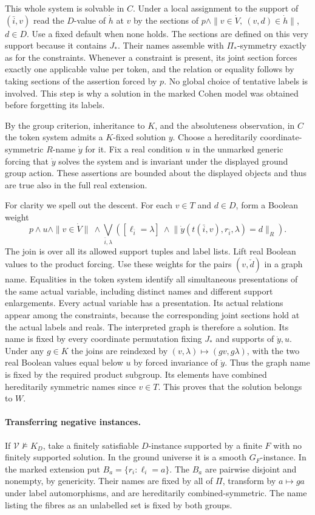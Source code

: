 \documentclass[11pt]{article}
\begin{document}
This whole system is solvable in $C$. Under a local assignment to the support of $(\bar i,v)$ read the $D$-value of $\dot h$ at $v$ by the sections of $p\wedge\|v\in\dot V,\ (v,d)\in\dot h\|$, $d\in D$. Use a fixed default when none holds. The sections are defined on this very support because it contains $J_*$. Their names assemble with $\Pi_*$-symmetry exactly as for the constraints. Whenever a constraint is present, its joint section forces exactly one applicable value per token, and the relation or equality follows by taking sections of the assertion forced by $p$. No global choice of tentative labels is involved. This step is why a solution in the marked Cohen model was obtained before forgetting its labels.

By the group criterion, inheritance to $K$, and the absoluteness observation, in $C$ the token system admits a $K$-fixed solution $y$. Choose a hereditarily coordinate-symmetric $R$-name $\dot y$ for it. Fix a real condition $u$ in the unmarked generic forcing that $\dot y$ solves the system and is invariant under the displayed ground group action. These assertions are bounded about the displayed objects and thus are true also in the full real extension.

For clarity we spell out the descent. For each $v\in T$ and $d\in D$, form a Boolean weight
\[
 p\wedge u\wedge\|v\in\dot V\|\ \wedge
 \bigvee_{\bar i,\lambda}
 \left( [\ell_{\bar i}=\lambda]\ \wedge \big\|\dot y(t(\bar i,v),r_{\bar i},\lambda)=d\big\|_R\right).
\]
The join is over all its allowed support tuples and label lists. Lift real Boolean values to the product forcing. Use these weights for the pairs $(v,\check d)$ in a graph name. Equalities in the token system identify all simultaneous presentations of the same actual variable, including distinct names and different support enlargements. Every actual variable has a presentation. Its actual relations appear among the constraints, because the corresponding joint sections hold at the actual labels and reals. The interpreted graph is therefore a solution. Its name is fixed by every coordinate permutation fixing $J_*$ and supports of $\dot y,u$. Under any $g\in K$ the joins are reindexed by $(v,\lambda)\mapsto(gv,g\lambda)$, with the two real Boolean values equal below $u$ by forced invariance of $\dot y$. Thus the graph name is fixed by the required product subgroup. Its elements have combined hereditarily symmetric names since $v\in T$. This proves that the solution belongs to $W$.

\paragraph{Transferring negative instances.}
If $\mathcal V\not\models K_D$, take a finitely satisfiable $D$-instance supported by a finite $F$ with no finitely supported solution. In the ground universe it is a smooth $G_F$-instance. In the marked extension put $B_a=\{r_i:\ell_i=a\}$. The $B_a$ are pairwise disjoint and nonempty, by genericity. Their names are fixed by all of $\Pi$, transform by $a\mapsto ga$ under label automorphisms, and are hereditarily combined-symmetric. The name listing the fibres as an unlabelled set is fixed by both groups.
\end{document}
